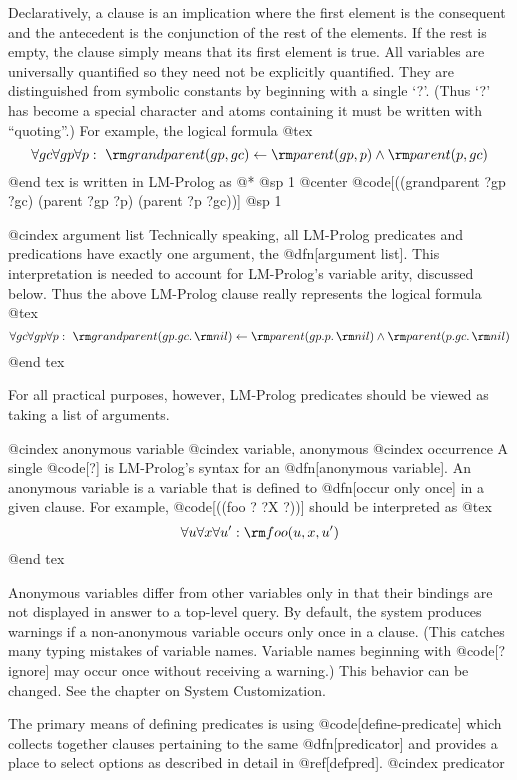 {Declaratively, a clause is an implication where the first element is
the consequent and the antecedent is the conjunction of the rest of
the elements.  If the rest is empty, the clause simply means that its
first element is true.  All variables are universally quantified so
they need not be explicitly quantified.  They are distinguished from
symbolic constants by beginning with a single `?'.  (Thus `?' has become
a special character and atoms containing it must be written with
``quoting''.) For example, the logical formula
@tex
$$\forall gc \forall gp \forall p:\ \mathop{\rm grandparent}(gp,gc) \leftarrow \mathop{\rm parent}(gp,p) \land \mathop{\rm parent}(p, gc)$$
@end tex
is written in LM-Prolog as @*
@sp 1
@center @code[((grandparent ?gp ?gc) (parent ?gp ?p) (parent ?p ?gc))]
@sp 1

@cindex argument list
Technically speaking, all LM-Prolog predicates and predications
have exactly one argument, the @dfn[argument list]. 
This interpretation is
needed to account for LM-Prolog's variable arity, discussed below.
Thus the above LM-Prolog clause really represents the logical formula
@tex
$$\forall gc \forall gp \forall p:\ \mathop{\rm grandparent}(gp.gc.\mathop{\rm nil}) \leftarrow \mathop{\rm parent}(gp.p.\mathop{\rm nil}) \land \mathop{\rm parent}(p.gc.\mathop{\rm nil})$$
@end tex

For all practical purposes, however, LM-Prolog predicates should be
viewed as taking a list of arguments.

@cindex anonymous variable
@cindex variable, anonymous
@cindex occurrence
A single @code[?] is LM-Prolog's syntax for an @dfn[anonymous variable].  
An anonymous variable is a variable that is defined to @dfn[occur only once]
in a given clause.
For example, @code[((foo ? ?X ?))] should be interpreted as
@tex
$$\forall u \forall x \forall u^{\prime}: \mathop{\rm foo}(u,x,u^{\prime})$$
@end tex

Anonymous variables differ from other variables only in that their
bindings are not displayed in answer to a top-level query.  By
default, the system produces warnings if a non-anonymous variable
occurs only once in a clause.  (This catches many typing mistakes of
variable names.  Variable names beginning with @code[?ignore] may occur
once without receiving a warning.)  This behavior can be changed.  See
the chapter on System Customization.

The primary means of defining predicates is using @code[define-predicate]
which collects together clauses pertaining to the same @dfn[predicator] and 
provides a place to select options as described in detail in @ref[defpred].
@cindex predicator

}
